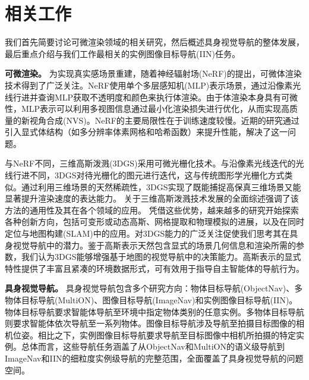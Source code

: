 \section{相关工作}

我们首先简要讨论可微渲染领域的相关研究，然后概述具身视觉导航的整体发展，最后重点介绍与我们工作最相关的实例图像目标导航(IIN)任务。

\textbf{可微渲染。} 为实现真实感场景重建，随着神经辐射场(NeRF)\cite{mildenhall2020nerf}的提出，可微体渲染技术得到了广泛关注。NeRF使用单个多层感知机(MLP)表示场景，通过沿像素光线行进并查询MLP获取不透明度和颜色来执行体渲染。由于体渲染本身具有可微性，MLP表示可以利用多视图信息通过最小化渲染损失进行优化，从而实现高质量的新视角合成(NVS)。NeRF的主要局限性在于训练速度较慢。近期的研究通过引入显式体结构（如多分辨率体素网格\cite{fridovich2022plenoxels, liu2020neural, sun2022direct}和哈希函数\cite{muller2022instant}）来提升性能，解决了这一问题。

与NeRF不同，三维高斯泼溅(3DGS)\cite{kerbl3Dgaussians}采用可微光栅化技术。与沿像素光线迭代的光线行进不同，3DGS对待光栅化的图元进行迭代，这与传统图形学光栅化方式类似。通过利用三维场景的天然稀疏性，3DGS实现了既能捕捉高保真三维场景又能显著提升渲染速度的表达能力。
关于三维高斯泼溅技术发展的全面综述\cite{chen2024survey}强调了该方法的通用性及其在各个领域的应用。
凭借这些优势，越来越多的研究开始探索各种创新方向，包括可变形或动态高斯\cite{luiten2023dynamic, wu20234dgaussians, yang2023deformable3dgs}、网格提取和物理模拟的进展\cite{feng2024gaussian,xie2023physgaussian,guedon2023sugar}，以及在同时定位与地图构建(SLAM)中的应用\cite{keetha2023splatam, matsuki2023gaussian, yugay2023gaussianslam}。对3DGS能力的广泛关注促使我们思考其在具身视觉导航中的潜力。鉴于高斯表示天然包含显式的场景几何信息和渲染所需的参数，我们认为3DGS能够增强基于地图的视觉导航中的决策能力。高斯表示的显式特性提供了丰富且紧凑的环境数据形式，可有效用于指导自主智能体的导航行为。

\textbf{具身视觉导航。} 具身视觉导航包含多个研究方向：物体目标导航(ObjectNav)、多物体目标导航(MultiON)、图像目标导航(ImageNav)和实例图像目标导航(IIN)。物体目标导航\cite{majumdar2022zson, chaplot2020object, wang2024find, chang2020semantic, chaplot2021seal}要求智能体导航至环境中指定物体类别的任意实例。多物体目标导航\cite{chen2022learning, wani2020multion, schmalstieg2022learning, marza2023multi}则要求智能体依次导航至一系列物体。图像目标导航\cite{al2022zero, choi2021image, yadav2023ovrl, yadav2023offline, Kwon_2023_CVPR,Chaplot_2020_CVPR,savinov2018semi,TSGM, wasserman2022lastmile}涉及导航至拍摄目标图像的相机位姿。相比之下，实例图像目标导航\cite{krantz2023navigating, bono2023endtoend, lei2024instanceaware}要求导航至目标图像中相机所拍摄的特定实例。总体而言，这些导航任务涵盖了从ObjectNav和MultiON的语义级导航到ImageNav和IIN的细粒度实例级导航的完整范围，全面覆盖了具身视觉导航的问题空间。

